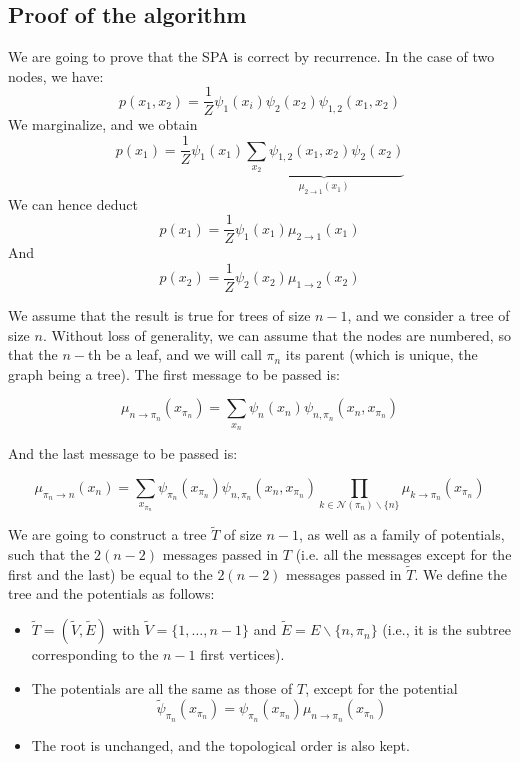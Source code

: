 \documentclass[12pt,a4paper]{report}
\newcommand{\forscribe}[2]{#2}  %
\begin{document}
\subsection{Proof of the algorithm}

We are going to prove that the SPA is correct by recurrence. %
In the case of two nodes, we have:
\[
    p(x_1,x_2) = \frac{1}{Z}\psi_1(x_i)\psi_2(x_2)\psi_{1\forscribe{}{,}2}(x_1,x_2)
\]
We marginalize, and we obtain
\[
    p(x_1)=\frac{1}{Z}\psi_1(x_1)\underbrace{\sum_{x_2}\psi_{1\forscribe{}{,}2}(x_1,x_2)\psi_2(x_2)}_
    {\mu_{2 \rightarrow 1}(x_1)}
\]
We can hence deduct
\[
    p(x_1)=\frac{1}{Z}\psi_1(x_1)\mu_{2\rightarrow1}(x_1)
\]
And
\[
    p(x_2)=\frac{1}{Z}\psi_2(x_2)\mu_{1\rightarrow2}(x_2)
\]

We assume that the result is true for trees of size $n-1$, and we consider a tree of size $n$. Without loss of generality, we can assume that the nodes are numbered, so that the $n-$th be a leaf, and we will call $\pi_n$ its parent (which is unique, the graph being a tree). The first message to be passed is:

\begin{equation}
    \mu_{n\rightarrow \pi_n}(x_{\pi_n})= \sum_{x_n}\psi_n(x_n)\psi_{n\forscribe{}{,}\pi_n}(x_n,x_{\pi_n})
\end{equation}

And the last message to be passed is:

\begin{equation}
\mu_{\pi_n \rightarrow n}(x_n) = \sum_{x_{\pi_n}} \psi_{\pi_n}(x_{\pi_n}) \psi_{n\forscribe{}{,}\pi_n}(x_n,x_{\pi_n}) \prod_{k \in \mathcal{N}(\pi_n)\backslash \{n\}} \mu_{k \rightarrow \pi_n}(x_{\pi_n})
\end{equation}

We are going to construct a tree $\tilde{T}$ of size $n-1$, as well as a family of potentials, such that the $2(n-2)$ messages passed in $T$ (i.e. all the messages except for the first and the last) be equal to the $2(n-2)$ messages passed in $\tilde{T}$.
We define the tree and the potentials as follows:

\begin{itemize}
	\item $\tilde{T} = ( \tilde{V}, \tilde{E})$ with $\tilde{V} = \{1,\dots,n-1\}$ and $\tilde{E} = E \backslash \{ n,\pi_n\}$ (i.e., it is the subtree corresponding to the $n-1$ first vertices).
	
	\item The potentials are all the same as those of $T$, except for the potential
	\begin{equation}
		\tilde{\psi}_{\pi_n}(x_{\pi_n}) = {\psi}_{\pi_n}(x_{\pi_n}) \mu_{n\rightarrow \pi_n}(x_{\pi_n})
	\end{equation}
	
	\item The root is unchanged, and the topological order is also kept.
\end{itemize}
\end{document}
